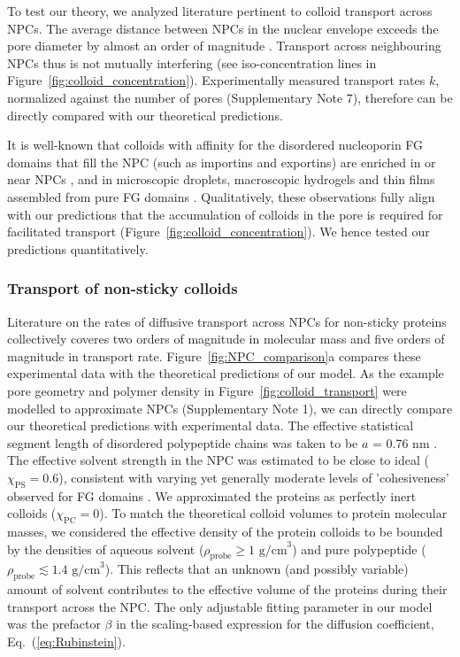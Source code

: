 \documentclass[12pt, a4paper]{article}
\begin{document}
To test our theory, we analyzed literature pertinent to colloid transport across NPCs.
The average distance between NPCs in the nuclear envelope exceeds the pore diameter by almost an order of magnitude \cite{Winey1997, Varberg2022, Maeshima2006}.
Transport across neighbouring NPCs thus is not mutually interfering \cite{Fabrikant1985} (see iso-concentration lines in Figure~\ref{fig:colloid_concentration}). Experimentally measured transport rates $k$, normalized against the number of pores (Supplementary Note 7), therefore can be directly compared with our theoretical predictions.

It is well-known that colloids with affinity for the disordered nucleoporin FG domains that fill the NPC (such as importins and exportins) are enriched in or near NPCs \cite{Beck2007, Lowe2015, Kim2018}, and in microscopic droplets, macroscopic hydrogels and thin films assembled from pure FG domains \cite{Schmidt2015, Zahn2016, Vovk2016, Frey2018}.
Qualitatively, these observations fully align with our predictions that the accumulation of colloids in the pore is required for facilitated transport (Figure~\ref{fig:colloid_concentration}).
We hence tested our predictions quantitatively.


\subsubsection{Transport of non-sticky colloids}

Literature on the rates of diffusive transport across NPCs for non-sticky proteins \cite{Ribbeck2001, Mohr2009, Popken2015, Timney2016, Frey2018} collectively coveres two orders of magnitude in molecular mass and five orders of magnitude in transport rate.
Figure~\ref{fig:NPC_comparison}a compares these experimental data with the theoretical predictions of our model.
As the example pore geometry and polymer density in Figure~\ref{fig:colloid_transport} were modelled to approximate NPCs (Supplementary Note 1), we can directly compare our theoretical predictions with experimental data.
The effective statistical segment length of disordered polypeptide chains was taken to be $a$ = 0.76 nm \cite{Hoogenboom2021}.
The effective solvent strength in the NPC was estimated to be close to ideal ($\chi_{\text{PS}} = 0.6$), consistent with varying yet generally moderate levels of 'cohesiveness' observed for FG domains \cite{Eisele2013, Zahn2016, Vovk2016, Fuertes2017, Hoogenboom2021}.
We approximated the proteins as perfectly inert colloids ($\chi_{\text{PC}} = 0$).
To match the theoretical colloid volumes to protein molecular masses, we considered the effective density of the protein colloids to be bounded by the densities of aqueous solvent ($\rho_{\text{probe}} \geq \text{1 g/cm}^3$) and pure polypeptide ($\rho_{\text{probe}} \lesssim \text{1.4 g/cm}^3$).
This reflects that an unknown (and possibly variable) amount of solvent contributes to the effective volume of the proteins during their transport across the NPC.
The only adjustable fitting parameter in our model was the prefactor $\beta$ in the scaling-based expression for the diffusion coefficient, Eq.~(\ref{eq:Rubinstein}).
\end{document}
